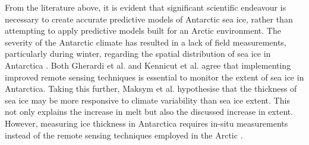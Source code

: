 
From the literature above, it is evident that significant scientific endeavour is necessary to create accurate predictive models of Antarctic sea ice, rather than attempting to apply predictive models built for an Arctic environment. The severity of the Antarctic climate has resulted in a lack of field measurements, particularly during winter, regarding the spatial distribution of sea ice in Antarctica \cite{Maksym2012}. Both Gherardi et al. \cite{Gherardi2015} and Kennicut et al. \cite{Kennicut2019} agree that implementing improved remote sensing techniques is essential to monitor the extent of sea ice in Antarctica. Taking this further, Maksym et al. \cite{Maksym2012} hypothesise that the thickness of sea ice may be more responsive to climate variability than sea ice extent. This not only explains the increase in melt but also the discussed increase in extent. However, measuring ice thickness in Antarctica requires in-situ measurements instead of the remote sensing techniques employed in the Arctic \cite{Gherardi2015, Thomas2017Chap8}.

